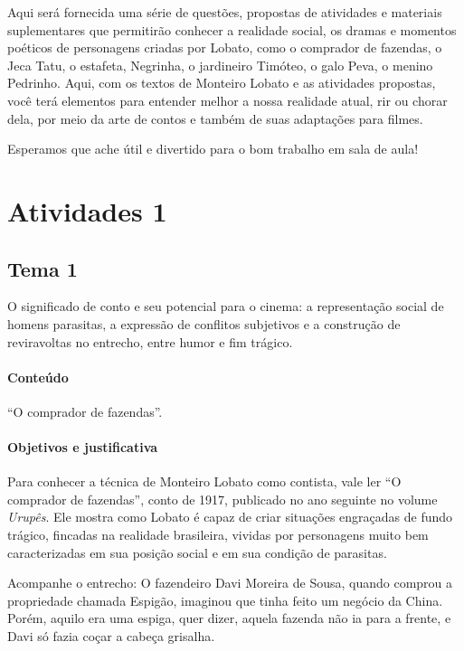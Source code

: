 \documentclass[12pt]{extarticle}
\begin{document}
Aqui será fornecida uma série de questões, propostas de atividades e
materiais suplementares que permitirão conhecer a realidade social, os
dramas e momentos poéticos de personagens criadas por Lobato, como o
comprador de fazendas, o Jeca Tatu, o estafeta, Negrinha, o jardineiro
Timóteo, o galo Peva, o menino Pedrinho. Aqui, com os textos de Monteiro
Lobato e as atividades propostas, você terá elementos para entender
melhor a nossa realidade atual, rir ou chorar dela, por meio da arte de
contos e também de suas adaptações para filmes.

Esperamos que ache útil e divertido para o bom trabalho em sala de aula!

\section{Atividades 1}

\subsection{Tema 1}

O significado de conto e seu potencial para o cinema: a representação
social de homens parasitas, a expressão de conflitos subjetivos e a
construção de reviravoltas no entrecho, entre humor e fim trágico.


\paragraph{Conteúdo} ``O comprador de fazendas''.

\paragraph{Objetivos e justificativa}
Para conhecer a técnica de Monteiro Lobato como contista, vale ler ``O
comprador de fazendas'', conto de 1917, publicado no ano seguinte no
volume \emph{Urupês}. Ele mostra como Lobato é capaz de criar situações
engraçadas de fundo trágico, fincadas na realidade brasileira, vividas
por personagens muito bem caracterizadas em sua posição social e em sua
condição de parasitas.

Acompanhe o entrecho: O fazendeiro Davi Moreira de Sousa, quando comprou
a propriedade chamada Espigão, imaginou que tinha feito um negócio da
China. Porém, aquilo era uma espiga, quer dizer, aquela fazenda não ia
para a frente, e Davi só fazia coçar a cabeça grisalha.
\end{document}
